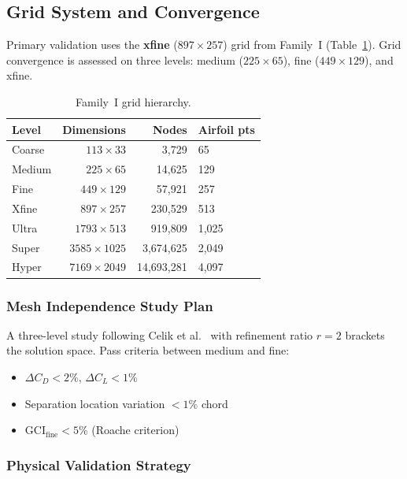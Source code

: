 \documentclass[11pt,a4paper]{article}
\begin{document}
\subsection{Grid System and Convergence}
\label{sec:grid}

Primary validation uses the \textbf{xfine} ($897\times257$) grid from
Family~I (Table~\ref{tab:grids}). Grid convergence is assessed on three levels:
medium ($225\times65$), fine ($449\times129$), and xfine.

\begin{table}[!ht]
\centering
\caption{Family~I grid hierarchy.}
\label{tab:grids}
\begin{tabular}{lrrl}
\toprule
\textbf{Level} & \textbf{Dimensions} & \textbf{Nodes} & \textbf{Airfoil pts} \\
\midrule
Coarse  & $113 \times 33$   & 3,729    & 65 \\
Medium  & $225 \times 65$   & 14,625   & 129 \\
Fine    & $449 \times 129$  & 57,921   & 257 \\
Xfine   & $897 \times 257$  & 230,529  & 513 \\
Ultra   & $1793 \times 513$ & 919,809  & 1,025 \\
Super   & $3585 \times 1025$ & 3,674,625 & 2,049 \\
Hyper   & $7169 \times 2049$ & 14,693,281 & 4,097 \\
\bottomrule
\end{tabular}
\end{table}

\subsubsection{Mesh Independence Study Plan}

A three-level study following Celik et al.~\cite{CelikEtAl2008} with refinement ratio
$r = 2$ brackets the solution space. Pass criteria between medium and fine:
\begin{itemize}
  \item $\Delta C_D < 2\%$, \quad $\Delta C_L < 1\%$
  \item Separation location variation $< 1\%$ chord
  \item $\text{GCI}_\text{fine} < 5\%$ (Roache criterion)
\end{itemize}

\subsubsection{Physical Validation Strategy}
\end{document}
